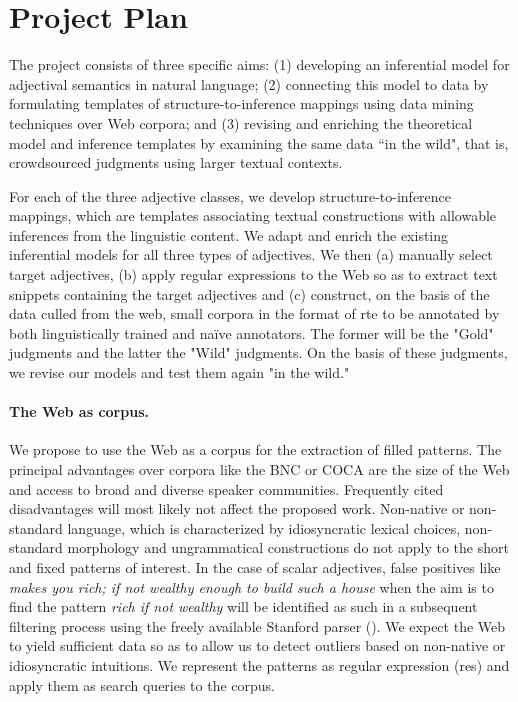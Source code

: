 \documentclass[10pt]{article}
\begin{document}
\section{Project Plan}



The project consists of three specific aims: (1) developing an inferential model for adjectival semantics in natural language; (2) connecting this model to data by formulating templates of structure-to-inference mappings using data mining techniques over Web corpora; and (3)
revising and enriching the  theoretical model and inference templates by examining the same data ``in the wild", that is,  crowdsourced judgments using larger textual contexts. 

For each of the three adjective classes, we develop structure-to-inference mappings, which are templates associating textual constructions with allowable inferences from the linguistic content. We adapt and enrich the existing inferential models for all three types of adjectives. We then (a) manually select target adjectives, (b) apply regular expressions to the Web so as to extract 
text snippets containing the target adjectives and (c) construct, on the basis of the data culled from the web, small corpora in the format of {\sc rte} 
to be annotated by both linguistically trained and na\"ive annotators. The former will be the "Gold" judgments and the latter the "Wild" judgments. On the basis of these judgments, we revise our models and test them again "in the wild." 

\paragraph{The Web as corpus.}
We propose to use the Web as a corpus for the extraction of filled patterns. 
The principal advantages over corpora like the BNC or COCA  are the size of the Web and access to broad and diverse speaker communities. 
Frequently cited disadvantages will most likely not affect the proposed work. Non-native or non-standard language, which is characterized by idiosyncratic lexical choices, 
non-standard morphology and ungrammatical constructions do not apply to the short and fixed patterns of interest. In the case of scalar adjectives, false positives 
like \textit{makes you rich; if not wealthy enough to build such a house} when the aim is to find the pattern \emph{rich if not wealthy} will be identified as such in 
a subsequent filtering process using the freely available Stanford parser (\cite{marneffe+maccartney+manning:2006}).
We expect the Web to yield sufficient data so as to allow us to detect outliers based on non-native or idiosyncratic intuitions. We represent the patterns as regular expression ({\sc re}s) and apply them as search queries to the corpus. 
\end{document}
